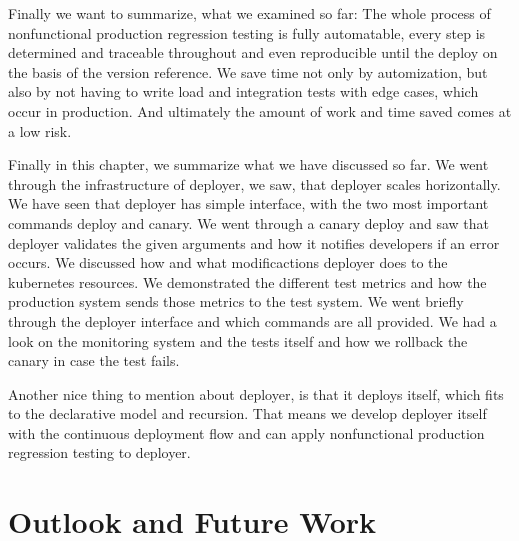 Finally we want to summarize, what we examined so far: The whole process of nonfunctional
production regression testing is fully automatable, every step is determined and traceable
throughout and even reproducible until the deploy on the basis of the version
reference. We save time not only by automization, but also by not having to write load and
integration tests with edge cases, which occur in production. And ultimately the amount of
work and time saved comes at a low risk.



Finally in this chapter, we summarize what we have discussed so far. We went through the
infrastructure of deployer, we saw, that deployer scales horizontally. We have seen that
deployer has simple interface, with the two most important commands deploy and canary. We
went through a canary deploy and saw that deployer validates the given arguments and how
it notifies developers if an error occurs. We discussed how and what modificactions
deployer does to the kubernetes resources. We demonstrated the different test metrics and
how the production system sends those metrics to the test system. We went briefly through
the deployer interface and which commands are all provided. We had a look on the
monitoring system and the tests itself and how we rollback the canary in case the test
fails.

Another nice thing to mention about deployer, is that it deploys itself, which fits to the
declarative model and recursion. That means we develop deployer itself with the continuous
deployment flow and can apply nonfunctional production regression testing to deployer.



\section{Outlook and Future Work}
